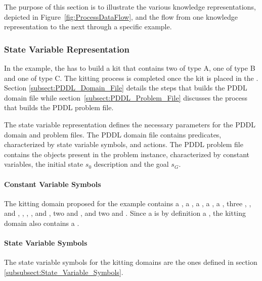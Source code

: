 The purpose of this section is to illustrate the various knowledge representations, depicted in Figure~\ref{fig:ProcessDataFlow}, and the flow from one knowledge representation to the next through a specific example.

\subsubsection{State Variable Representation}

In the example, the  has to build a kit that contains two  of type A, one  of type B and one  of type C. The kitting process is completed once the kit is placed in the . Section \ref{subsect:PDDL_Domain_File} details the steps that builds the PDDL domain file while section~\ref{subsect:PDDL_Problem_File} discusses the process that builds the PDDL problem file.

The state variable representation defines the necessary parameters for the PDDL domain and problem files. The PDDL domain file contains predicates, characterized by state variable symbols, and actions. The PDDL problem file contains the objects present in the problem instance, characterized by constant variables, the initial state $s_0$ description and the goal $s_G$.



\paragraph{Constant Variable Symbols}
The kitting domain proposed for the example contains a  , a  , a  , a  , a  , three  , , and ,  , , , and , two   and , and two    and . Since a  is by definition a , the kitting domain also contains a  .

\paragraph{State Variable Symbols}
The state variable symbols for the kitting domains are the ones defined in section \ref{subsubsect:State_Variable_Symbols}.


